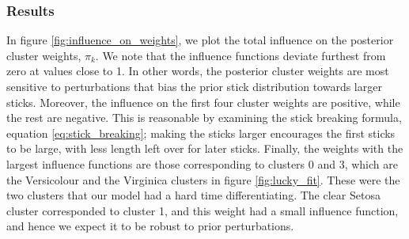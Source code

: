 \documentclass[a4paper]{article}
\begin{document}
\subsubsection{Results}

In figure \ref{fig:influence_on_weights}, we plot the total influence on the posterior cluster weights,
$\pi_k$. We note that the influence functions deviate furthest from zero at values close to 1.
In other words, the posterior cluster weights are most sensitive to
perturbations that bias the prior stick distribution towards
larger sticks. Moreover, the influence on the first four cluster weights are positive, while the
rest are negative. This is reasonable by examining the stick breaking formula,
equation \ref{eq:stick_breaking}; making the sticks larger encourages the first sticks
to be large, with less length left over for later sticks. Finally, the weights with the largest
influence functions are those corresponding to clusters 0 and 3,
which are the Versicolour and the Virginica clusters in figure \ref{fig:lucky_fit}.
These were the two clusters that our model had a hard time differentiating.
The clear Setosa cluster corresponded to cluster 1, and this weight had a small influence function,
and hence we expect it to be robust to prior perturbations.
\end{document}
